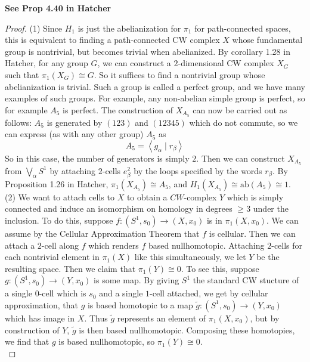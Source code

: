 \documentclass[reqno]{amsart}
\theoremstyle{definition}
\theoremstyle{remark}
\begin{document}
    \textbf{See Prop 4.40 in Hatcher}

    \begin{proof}
        (1) Since $H_1$ is just the abelianization for
        $\pi_1$ for path-connected spaces,
        this is equivalent to finding
        a path-connected CW complex
        $X$ whose fundamental group is nontrivial, but
        becomes trivial when abelianized. 
        By corollary 1.28 in Hatcher, for any
        group $G$, we can construct a $2$-dimensional CW
        complex $X_G$ such that $\pi_1 (X_G) \cong G$.
        So it suffices to find a nontrivial group whose
        abelianization is trivial. Such a group is
        called a perfect group, and we have
        many examples of such groups. For example,
        any non-abelian simple group is perfect, so
        for example $A_5$ is perfect. 
        The construction of $X_{A_5}$  can now be
        carried out as follows: $A_5$ is 
        generated by
        $\left( 123 \right) $ and
        $\left( 12345 \right) $ which do not commute,
        so we can express (as with any other group)
        $A_5$ as
        \[
        A_5 = \left< g_{\alpha} \mid r_{\beta} \right>
        \] 
        So in this case, the number of generators is simply $2$.
        Then we can construct $X_{A_5}$ from
        $\bigvee_{\alpha} S^{1}$ by attaching
        $2$-cells $e_{\beta}^2$ by the loops specified by
        the words $r_{\beta}$. By Proposition 1.26 in Hatcher,
        $\pi_1 \left( X_{A_5} \right) \cong
        A_5$, and
        $H_1 \left( X_{A_5} \right) 
        \cong \text{ab}\left( A_5 \right) \cong 1 $.\\
        \linebreak
        (2) We want to attach cells to $X$ to obtain
        a $CW$-complex $Y$ which is simply
        connected and induce an isomorphism on
        homology in degrees $\ge 3$ under the inclusion.
        To do this, suppose
        $f \colon \left( S^{1}, s_0 \right) 
        \to \left( X, x_0 \right) $ is
        in $\pi_1 (X, x_0)$. We can assume
        by the Cellular Approximation Theorem that
        $f$ is cellular. Then
        we can attach a $2$-cell along $f$ which renders
        $f$ based nullhomotopic. Attaching $2$-cells for
        each nontrivial element in $\pi_1(X)$ like this simultaneously,
        we let $Y$ be the resulting space.
        Then we claim that $\pi_1 (Y) \cong 0$.
        To see this, suppose 
        $g \colon \left( S^{1}, s_0 \right) \to 
        \left( Y, x_0 \right) $ is some map. By
        giving $S^{1}$ the standard CW stucture of a single
        $0$-cell which is $s_0$ and a single $1$-cell attached,
        we get by cellular approximation, that
        $g$ is based homotopic to 
        a map $\tilde{g} \colon \left( S^{1}, s_0 \right) 
        \to \left( Y, x_0 \right) $ which has image
        in $X$. Thus $\tilde{g}$ represents
        an element of $\pi_1 \left( X, x_0 \right) $,
        but by construction of $Y$, $\tilde{g}$ is then
        based nullhomotopic. Composing these homotopies,
        we find that $g$ is based nullhomotopic, so
        $\pi_1 \left( Y \right) \cong 0$.\\
        \linebreak
        

\end{proof}
\end{document}
